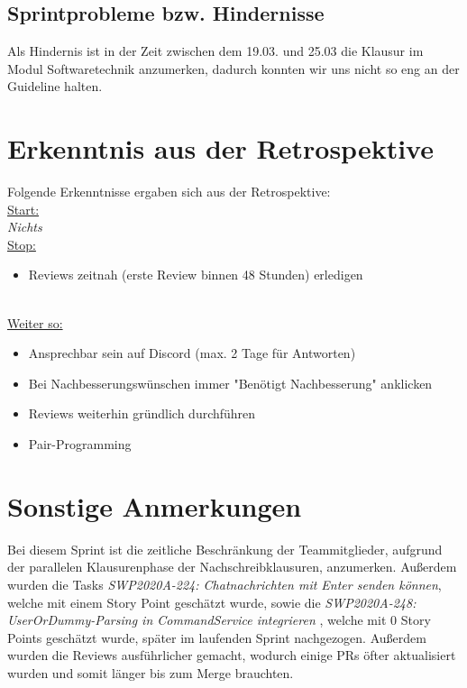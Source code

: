 \documentclass[12pt,a4paper, oneside]{article}
\begin{document}
\subsection{Sprintprobleme bzw. Hindernisse}
Als Hindernis ist in der Zeit zwischen dem 19.03. und 25.03
die Klausur im Modul Softwaretechnik anzumerken, dadurch konnten
wir uns nicht so eng an der Guideline halten.

\newpage
\section{Erkenntnis aus der Retrospektive}
Folgende Erkenntnisse ergaben sich aus der Retrospektive:\\

\underline{Start:}\\
\textit{Nichts}\\

\underline{Stop:}
\begin{itemize}
    \item Reviews zeitnah (erste Review binnen 48 Stunden) erledigen
\end{itemize}\\

\underline{Weiter so:}
\begin{itemize}
    \item Ansprechbar sein auf Discord (max. 2 Tage für Antworten)
    \item Bei Nachbesserungswünschen immer "Benötigt Nachbesserung" anklicken
    \item Reviews weiterhin gründlich durchführen
    \item Pair-Programming
\end{itemize}

\newpage

\section{Sonstige Anmerkungen}

Bei diesem Sprint ist die zeitliche Beschränkung der Teammitglieder, aufgrund der parallelen Klausurenphase der Nachschreibklausuren, anzumerken. Außerdem wurden die Tasks \textit{SWP2020A-224: Chatnachrichten mit Enter senden können}, welche mit einem Story Point geschätzt wurde, sowie die \textit{SWP2020A-248: UserOrDummy-Parsing in CommandService integrieren} , welche mit 0 Story Points geschätzt wurde, später im laufenden Sprint nachgezogen.
Außerdem wurden die Reviews ausführlicher gemacht, wodurch einige PRs öfter aktualisiert wurden und somit länger
bis zum Merge brauchten.
\end{document}
